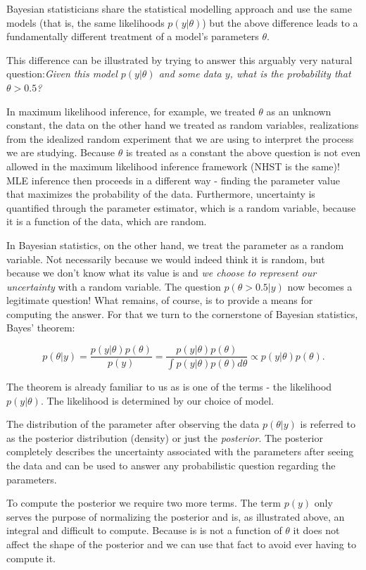 \documentclass{book}
\theoremstyle{plain}%
\theoremstyle{definition}
\begin{document}
Bayesian statisticians share the statistical modelling approach and use the same models (that is, the same likelihoods $p(y|\theta)$) but the above difference leads to a fundamentally different treatment of a model's parameters $\theta$.

This difference can be illustrated by trying to answer this arguably very natural question:\emph{Given this model $p(y|\theta)$ and some data $y$, what is the probability that $\theta > 0.5$?}

In maximum likelihood inference, for example, we treated $\theta$ as an unknown constant, the data on the other hand we treated as random variables, realizations from the idealized random experiment that we are using to interpret the process we are studying.    Because $\theta$ is treated as a constant the above question is not even allowed in the maximum likelihood inference framework (NHST is the same)! MLE inference then proceeds in a different way - finding the parameter value that maximizes the probability of the data. Furthermore, uncertainty is quantified through the parameter estimator, which is a random variable, because it is a function of the data, which are random.

In Bayesian statistics, on the other hand, we treat the parameter as a random variable. Not necessarily because we would indeed think it is random, but because we don't know what its value is and \emph{we choose to represent our uncertainty} with a random variable. The question $p(\theta > 0.5|y)$ now becomes a legitimate question! What remains, of course, is to provide a means for computing the answer. For that we turn to the cornerstone of Bayesian statistics, Bayes' theorem:

$$p(\theta|y) = \frac{p(y|\theta)p(\theta)}{p(y)} = \frac{p(y|\theta)p(\theta)}{\int p(y|\theta)p(\theta)d\theta} \propto p(y|\theta)p(\theta).$$

The theorem is already familiar to us as is one of the terms - the likelihood $p(y|\theta)$. The likelihood is determined by our choice of model.

The distribution of the parameter after observing the data $p(\theta|y)$ is referred to as the posterior distribution (density) or just the \emph{posterior}. The posterior completely describes the uncertainty associated with the parameters after seeing the data and can be used to answer any probabilistic question regarding the parameters.

To compute the posterior we require two more terms. The term $p(y)$ only serves the purpose of normalizing the posterior and is, as illustrated above, an integral and difficult to compute. Because is is not a function of $\theta$ it does not affect the shape of the posterior and we can use that fact to avoid ever having to compute it.
\end{document}
